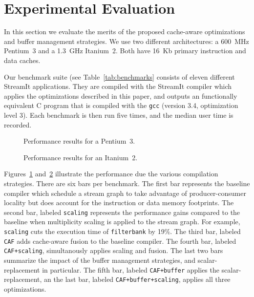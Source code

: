 \section{Experimental Evaluation}
\label{sec:evaluation}

In this section we evaluate the merits of the proposed cache-aware
optimizations and buffer management strategies. We use two
different architectures: a 600~MHz Pentium~3 and a 1.3~GHz
Itanium~2. Both have 16~Kb primary instruction and data caches.

Our benchmark suite (see Table~\ref{tab:benchmarks} consists of eleven
different StreamIt applications. They are compiled with the StreamIt
compiler which applies the optimizations described in this paper, and
outputs an functionally equivalent C program that is compiled with the
\texttt{gcc} (version 3.4, optimization level 3). Each benchmark is
then run five times, and the median user time is recorded.

\begin{figure}
  \caption{Performance results for a Pentium~3.}
  \label{fig:results-p3}
\end{figure}

\begin{figure}
  \caption{Performance results for an Itanium~2.}
  \label{fig:results-ipf}
\end{figure}

Figures~\ref{fig:results-p3} and~\ref{fig:results-ipf} illustrate the
performance due the various compilation strategies. There are six bars
per benchmark. The first bar represents the baseline compiler which
schedule a stream graph to take advantage of producer-consumer
locality but does account for the instruction or data memory
footprints. The second bar, labeled {\tt scaling} represents the
performance gains compared to the baseline when multiplicity scaling
is applied to the stream graph. For example, {\tt scaling} cuts the
execution time of \texttt{filterbank} by 19\%. The third bar, labeled
{\tt CAF} adds cache-aware fusion to the baseline compiler. The fourth
bar, labeled \texttt{CAF+scaling}, simultanously applies scaling and
fusion. The last two bars summarize the impact of the buffer
management strategies, and scalar-replacement in particular. 
The fifth bar, labeled \texttt{CAF+buffer}
applies the scalar-replacement, an the last bar,
labeled \texttt{CAF+buffer+scaling}, applies all three optimizations.

